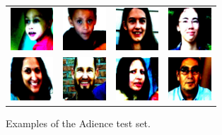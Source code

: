 \documentclass[journal]{IEEEtran}
\begin{document}
\begin{itemize}
		\begin{figure}[!t]
			\centering
			\begin{tabular}{cccc}
				\includegraphics[width=1.6cm]{img/adience/1.jpg} & \includegraphics[width=1.6cm]{img/adience/2.jpg} & \includegraphics[width=1.6cm]{img/adience/3.jpg} & \includegraphics[width=1.6cm]{img/adience/4.jpg}\\
				\includegraphics[width=1.6cm]{img/adience/5.jpg} & \includegraphics[width=1.6cm]{img/adience/6.jpg} & \includegraphics[width=1.6cm]{img/adience/7.jpg} & \includegraphics[width=1.6cm]{img/adience/8.jpg}
			\end{tabular}						
			\caption{Examples of the Adience test set.}
			\label{fig:AdienceExamples}
		\end{figure}
	\end{itemize}
	
\end{document}
